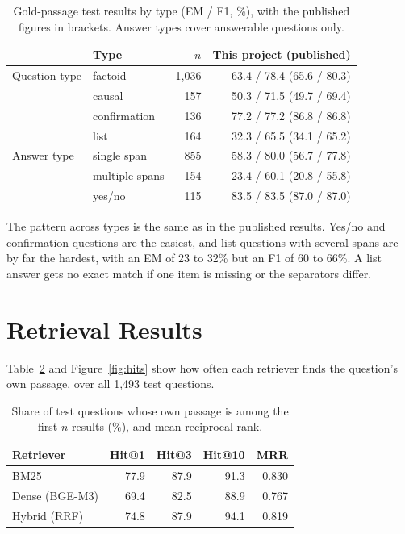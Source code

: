 \begin{table}[H]
	\centering
	\caption{Gold-passage test results by type (EM / F1, \%), with the published figures in brackets. Answer types cover answerable questions only.}
	\label{tab:types}
	\small
	\begin{tabular}{llrr}
		\toprule
		 & Type & $n$ & This project (published) \\
		\midrule
		Question type & factoid & 1,036 & 63.4 / 78.4 (65.6 / 80.3) \\
		 & causal & 157 & 50.3 / 71.5 (49.7 / 69.4) \\
		 & confirmation & 136 & 77.2 / 77.2 (86.8 / 86.8) \\
		 & list & 164 & 32.3 / 65.5 (34.1 / 65.2) \\
		\midrule
		Answer type & single span & 855 & 58.3 / 80.0 (56.7 / 77.8) \\
		 & multiple spans & 154 & 23.4 / 60.1 (20.8 / 55.8) \\
		 & yes/no & 115 & 83.5 / 83.5 (87.0 / 87.0) \\
		\bottomrule
	\end{tabular}
\end{table}

The pattern across types is the same as in the published results. Yes/no and confirmation questions are the easiest, and list questions with several spans are by far the hardest, with an EM of 23 to 32\% but an F1 of 60 to 66\%. A list answer gets no exact match if one item is missing or the separators differ.

\section{Retrieval Results}
\label{sec:retrieval}

Table~\ref{tab:hit} and Figure~\ref{fig:hits} show how often each retriever finds the question's own passage, over all 1,493 test questions.

\begin{table}[H]
	\centering
	\caption{Share of test questions whose own passage is among the first $n$ results (\%), and mean reciprocal rank.}
	\label{tab:hit}
	\begin{tabular}{lrrrr}
		\toprule
		Retriever & Hit@1 & Hit@3 & Hit@10 & MRR \\
		\midrule
		BM25 & 77.9 & 87.9 & 91.3 & 0.830 \\
		Dense (BGE-M3) & 69.4 & 82.5 & 88.9 & 0.767 \\
		Hybrid (RRF) & 74.8 & 87.9 & 94.1 & 0.819 \\
		\bottomrule
	\end{tabular}
\end{table}

